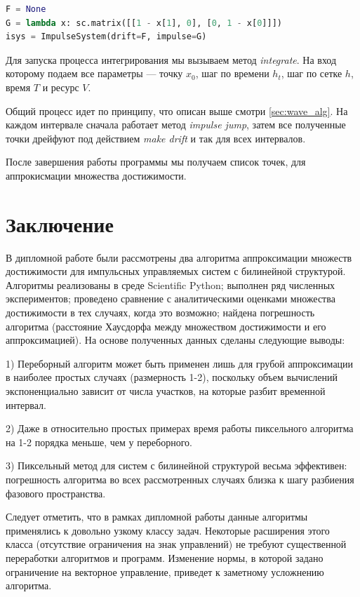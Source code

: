 \documentclass[a4paper,12pt]{article}
\begin{document}
\begin{lstlisting}[language=Python,
caption={Интерфейс Impulse System}]
F = None
G = lambda x: sc.matrix([[1 - x[1], 0], [0, 1 - x[0]]])
isys = ImpulseSystem(drift=F, impulse=G)
\end{lstlisting}

Для запуска процесса интегрирования мы вызываем метод
\emph{integrate}. На вход которому подаем все параметры --- точку
$x_0$, шаг по времени $h_t$, шаг по сетке $h$, время $T$ и ресурс $V$.

Общий процесс идет по принципу, что описан выше смотри
\ref{sec:wave_alg}. На каждом интервале сначала работает метод
\emph{impulse jump}, затем все полученные точки дрейфуют под действием
\emph{make drift} и так для всех интервалов.

После завершения работы программы мы получаем список точек, для
аппрокисмации множества достижимости.

\section*{Заключение}
\label{sec:conclusion}

В дипломной работе были рассмотрены два алгоритма аппроксимации множеств
достижимости для импульсных управляемых систем с билинейной структурой.
Алгоритмы реализованы в среде Scientific Python; выполнен ряд численных
экспериментов; проведено сравнение с аналитическими оценками множества
достижимости в тех случаях, когда это возможно; найдена погрешность алгоритма
(расстояние Хаусдорфа между множеством достижимости и его аппроксимацией). На
основе полученных данных сделаны следующие выводы:

1) Переборный алгоритм может быть применен лишь для грубой аппроксимации в
наиболее простых случаях (размерность 1-2), поскольку объем вычислений
экспоненциально зависит от числа участков, на которые разбит временной
интервал.

2) Даже в относительно простых примерах время работы пиксельного алгоритма на
1-2 порядка меньше, чем у переборного.

3) Пиксельный метод для систем с билинейной структурой весьма эффективен:
погрешность алгоритма во всех рассмотренных случаях близка к шагу разбиения
фазового пространства.

Следует отметить, что в рамках дипломной работы данные алгоритмы применялись к
довольно узкому классу задач. Некоторые расширения этого класса (отсутствие
ограничения на знак управлений) не требуют существенной переработки алгоритмов
и программ. Изменение нормы, в которой задано ограничение на векторное
управление, приведет к заметному усложнению алгоритма.
\end{document}
